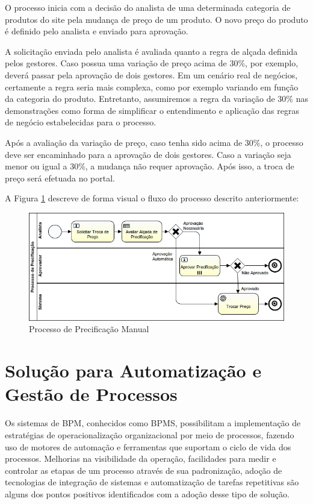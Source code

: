 O processo inicia com a decisão do analista de uma determinada categoria de produtos do site pela mudança de preço de um produto. O novo preço do produto é definido pelo analista e enviado para aprovação.

A solicitação enviada pelo analista é avaliada quanto a regra de alçada definida pelos gestores. Caso possua uma variação de preço acima de 30\%,  por exemplo, deverá passar pela aprovação de dois gestores. Em um cenário real de negócios, certamente a regra seria mais complexa, como por exemplo variando em função da categoria do produto. Entretanto, assumiremos a regra da variação de 30\% nas demonstrações como forma de simplificar o entendimento e aplicação das regras de negócio estabelecidas para o processo.

Após a avaliação da variação de preço, caso tenha sido acima de 30\%, o processo deve ser encaminhado para a aprovação de dois gestores. Caso a variação seja menor ou igual a 30\%, a mudança não requer aprovação. Após isso, a troca de preço será efetuada no portal.

A Figura \ref{fig:exemplo_bpmn-problema} descreve de forma visual o fluxo do processo descrito anteriormente:

\begin{figure}[H]
  \centering
  \includegraphics[width=1.0\textwidth]{imagens/ProcessoDePrecificacao.png}
  \caption{Processo de Precificação Manual}
  \label{fig:exemplo_bpmn-problema}
\end{figure}

\section{Solução para Automatização e Gestão de Processos}\label{sec:introducao-ferramenta}

Os sistemas de BPM\cite{bpm}, conhecidos como BPMS\cite{bpms}, possibilitam a implementação de estratégias de operacionalização organizacional por meio de processos, fazendo uso de motores de automação e ferramentas que suportam o ciclo de vida dos processos. Melhorias na visibilidade da operação, facilidades para medir e controlar as etapas de um processo através de sua padronização, adoção de tecnologias de integração de sistemas e automatização de tarefas repetitivas são alguns dos pontos positivos identificados com a adoção desse tipo de solução.  

